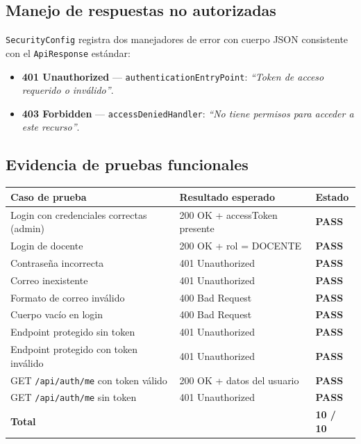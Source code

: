 \documentclass[11pt,a4paper,oneside]{article}
\newcommand{\code}[1]{\texttt{\small #1}}
\newcommand{\pass}{\textbf{\color{ataraVerde}PASS}}
\begin{document}
\subsection{Manejo de respuestas no autorizadas}

\code{SecurityConfig} registra dos manejadores de error con cuerpo JSON consistente con el
\code{ApiResponse} estándar:

\begin{itemize}[leftmargin=*]
  \item \textbf{401 Unauthorized} — \code{authenticationEntryPoint}: \emph{“Token de acceso
        requerido o inválido”}.
  \item \textbf{403 Forbidden} — \code{accessDeniedHandler}: \emph{“No tiene permisos para
        acceder a este recurso”}.
\end{itemize}

\subsection{Evidencia de pruebas funcionales}

\begin{table}[h]
\centering\renewcommand{\arraystretch}{1.15}\small
\begin{tabular}{@{}p{7.0cm} p{5.0cm} p{1.5cm}@{}}
\toprule
\textbf{Caso de prueba} & \textbf{Resultado esperado} & \textbf{Estado} \\
\midrule
Login con credenciales correctas (admin)    & 200 OK + accessToken presente    & \pass \\
Login de docente                            & 200 OK + rol = DOCENTE           & \pass \\
Contraseña incorrecta                       & 401 Unauthorized                 & \pass \\
Correo inexistente                          & 401 Unauthorized                 & \pass \\
Formato de correo inválido                  & 400 Bad Request                  & \pass \\
Cuerpo vacío en login                       & 400 Bad Request                  & \pass \\
Endpoint protegido sin token                & 401 Unauthorized                 & \pass \\
Endpoint protegido con token inválido       & 401 Unauthorized                 & \pass \\
GET \code{/api/auth/me} con token válido    & 200 OK + datos del usuario       & \pass \\
GET \code{/api/auth/me} sin token           & 401 Unauthorized                 & \pass \\
\midrule
\textbf{Total}                              &                                  & \textbf{10 / 10} \\
\bottomrule
\end{tabular}
\end{table}
\end{document}
